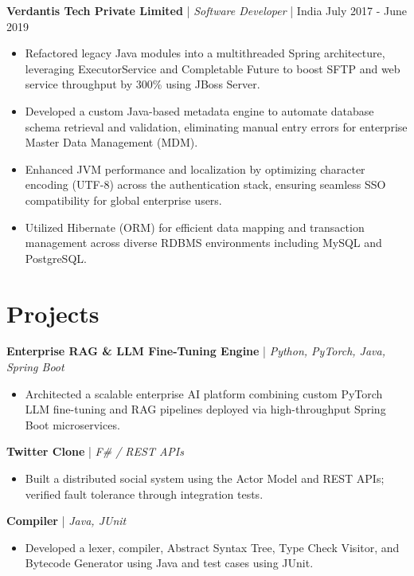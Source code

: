 \documentclass[9pt,letterpaper]{extarticle}
\begin{document}
\vspace{3pt}
\textbf{Verdantis Tech Private Limited} | \textit{Software Developer} | India \hfill July 2017 - June 2019
\begin{itemize}[leftmargin=0.15in, noitemsep, topsep=2pt, partopsep=0pt, parsep=0pt]
    \item Refactored legacy Java modules into a multithreaded Spring architecture, leveraging ExecutorService and Completable Future to boost SFTP and web service throughput by 300\% using JBoss Server.
    \item Developed a custom Java-based metadata engine to automate database schema retrieval and validation, eliminating manual entry errors for enterprise Master Data Management (MDM).
    \item Enhanced JVM performance and localization by optimizing character encoding (UTF-8) across the authentication stack, ensuring seamless SSO compatibility for global enterprise users.
    \item Utilized Hibernate (ORM) for efficient data mapping and transaction management across diverse RDBMS environments including MySQL and PostgreSQL.
\end{itemize}

\section{Projects}

\textbf{Enterprise RAG \& LLM Fine-Tuning Engine} | \textit{Python, PyTorch, Java, Spring Boot}
\begin{itemize}[leftmargin=0.15in, noitemsep, topsep=2pt, partopsep=0pt, parsep=0pt]
    \item Architected a scalable enterprise AI platform combining custom PyTorch LLM fine-tuning and RAG pipelines deployed via high-throughput Spring Boot microservices.
\end{itemize}

\textbf{Twitter Clone} | \textit{F\# / REST APIs}
\begin{itemize}[leftmargin=0.15in, noitemsep, topsep=2pt, partopsep=0pt, parsep=0pt]
    \item Built a distributed social system using the Actor Model and REST APIs; verified fault tolerance through integration tests.
\end{itemize}

\textbf{Compiler} | \textit{Java, JUnit}
\begin{itemize}[leftmargin=0.15in, noitemsep, topsep=2pt, partopsep=0pt, parsep=0pt]
    \item Developed a lexer, compiler, Abstract Syntax Tree, Type Check Visitor, and Bytecode Generator using Java and test cases using JUnit.
\end{itemize}
\end{document}
